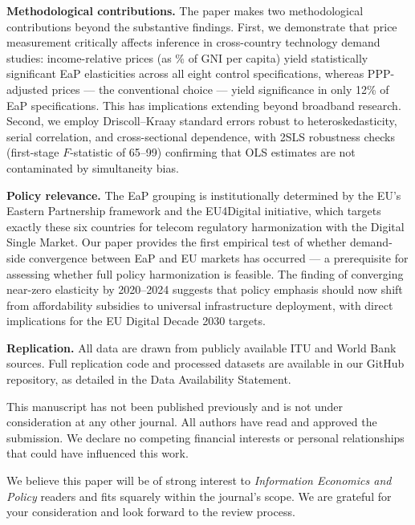 \documentclass[12pt]{article}
\begin{document}
\vspace{8pt}
\noindent\textbf{Methodological contributions.}\quad
The paper makes two methodological contributions beyond the substantive
findings. First, we demonstrate that price measurement critically affects
inference in cross-country technology demand studies: income-relative prices (as
\% of GNI per capita) yield statistically significant EaP elasticities across
all eight control specifications, whereas PPP-adjusted prices --- the
conventional choice --- yield significance in only 12\% of EaP specifications.
This has implications extending beyond broadband research. Second, we employ
Driscoll--Kraay standard errors robust to heteroskedasticity, serial
correlation, and cross-sectional dependence, with 2SLS robustness checks
(first-stage \(F\)-statistic of 65--99) confirming that OLS estimates are not
contaminated by simultaneity bias.

\vspace{8pt}
\noindent\textbf{Policy relevance.}\quad
The EaP grouping is institutionally determined by the EU's Eastern Partnership
framework and the EU4Digital initiative, which targets exactly these six
countries for telecom regulatory harmonization with the Digital Single Market.
Our paper provides the first empirical test of whether demand-side convergence
between EaP and EU markets has occurred --- a prerequisite for assessing whether
full policy harmonization is feasible. The finding of converging near-zero
elasticity by 2020--2024 suggests that policy emphasis should now shift from
affordability subsidies to universal infrastructure deployment, with direct
implications for the EU Digital Decade 2030 targets.

\vspace{8pt}
\noindent\textbf{Replication.}\quad
All data are drawn from publicly available ITU and World Bank sources. Full
replication code and processed datasets are available in our GitHub repository,
as detailed in the Data Availability Statement.

\vspace{10pt}
This manuscript has not been published previously and is not under consideration
at any other journal. All authors have read and approved the submission. We
declare no competing financial interests or personal relationships that could
have influenced this work.

We believe this paper will be of strong interest to \textit{Information
Economics and Policy} readers and fits squarely within the journal's scope. We
are grateful for your consideration and look forward to the review process.
\end{document}
